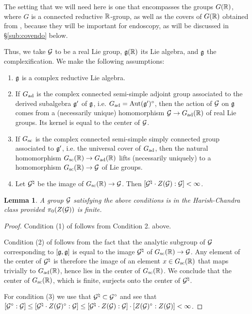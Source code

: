\documentclass{article}
\newtheorem{lem}[thm]{Lemma}
\theoremstyle{definition}
\numberwithin{equation}{section}
\renewcommand{\-}{\hyp{}}
\begin{document}
The setting that we will need here is one that encompasses the groups $G(\mathbb{R})$, where $G$ is a connected reductive $\mathbb{R}$-group, as well as the covers of $G(\mathbb{R})$ obtained from \cite{KalHDC}, because they will be important for endoscopy, as will be discussed in \S\ref{sub:covendo} below.

Thus, we take $\mathcal{G}$ to be a real Lie group, $\mathfrak{g}(\mathbb{R})$ its Lie algebra, and $\mathfrak{g}$ the complexification. We make the following assumptions:
\begin{enumerate}
	\item $\mathfrak{g}$ is a complex reductive Lie algebra.
 	\item If $G_{\textrm{ad}}$ is the complex connected semi-simple adjoint group associated to the derived subalgebra $\mathfrak{g}'$ of $\mathfrak{g}$, i.e. $G_{\textrm{ad}}=\textrm{Aut}(\mathfrak{g}')^\circ$, then the action of $\mathcal{G}$ on $\mathfrak{g}$ comes from a (necessarily unique) homomorphism $\mathcal{G} \to G_{\textrm{ad}}(\mathbb{R})$ of real Lie groups. Its kernel is equal to the center of $\mathcal{G}$.
  	\item If $G_{\textrm{sc}}$ is the complex connected semi-simple simply connected group associated to $\mathfrak{g}'$, i.e. the universal cover of $G_{\textrm{ad}}$, then the natural homomorphism $G_{\textrm{sc}}(\mathbb{R}) \to G_{\textrm{ad}}(\mathbb{R})$ lifts (necessarily uniquely) to a homomorphism $G_{\textrm{sc}}(\mathbb{R}) \to \mathcal{G}$ of Lie groups.
   	\item Let $\mathcal{G}^\natural$ be the image of $G_{\textrm{sc}}(\mathbb{R}) \to \mathcal{G}$. Then $[\mathcal{G}^\natural \cdot Z(\mathcal{G}):\mathcal{G}] < \infty$.
\end{enumerate}

\begin{lem} A group $\mathcal{G}$ satisfying the above conditions is in the Harish-Chandra class provided $\pi_0(Z(\mathcal{G}))$ is finite.
\end{lem}
\begin{proof}
	Condition (1) of \cite[\S3]{HC-R1} follows from Condition 2. above.
	
	Condition (2) of \cite[\S3]{HC-R1} follows from the fact that the analytic subgroup of $\mathcal{G}$ corresponding to $[\mathfrak{g},\mathfrak{g}]$ is equal to the image $\mathcal{G}^\natural$ of $G_{\textrm{sc}}(\mathbb{R}) \to \mathcal{G}$. Any element of the center of $\mathcal{G}^\natural$ is therefore the image of an element $x \in G_{\textrm{sc}}(\mathbb{R})$ that maps trivially to $G_{\textrm{ad}}(\mathbb{R})$, hence lies in the center of $G_{\textrm{sc}}(\mathbb{R})$. We conclude that the center of $G_{\textrm{sc}}(\mathbb{R})$, which is finite, surjects onto the center of $\mathcal{G}^\natural$.

	For condition (3) we use that $\mathcal{G}^\natural \subset \mathcal{G}^\circ$ and see that $[\mathcal{G}^\circ : \mathcal{G}] \leq [\mathcal{G}^\natural \cdot Z(\mathcal{G})^\circ : \mathcal{G}] \leq [\mathcal{G}^\natural \cdot Z(\mathcal{G}) : \mathcal{G}] \cdot [Z(\mathcal{G})^\circ:Z(\mathcal{G})] < \infty$.
\end{proof}
\end{document}
